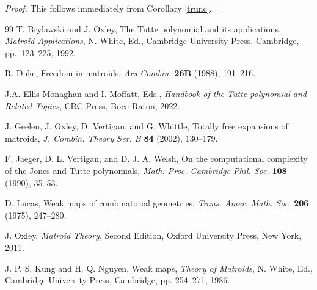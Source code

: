 \documentclass[12pt,reqno]{amsart}
\theoremstyle{definition}
\theoremstyle{remark}
\numberwithin{equation}{section}
\begin{document}
    \begin{proof}
        This follows immediately from Corollary \ref{trunc}. 
    \end{proof}


\begin{thebibliography}{99}
   T. Brylawski and J. Oxley, The Tutte polynomial and its applications, \textit{Matroid Applications}, N. White, Ed., Cambridge University Press, Cambridge, pp.~123–225, 1992.


   R. Duke, Freedom in matroids, \textit{Ars Combin.} \textbf{26B} (1988), 191--216.

   J.A. Ellis-Monaghan and I. Moffatt, Eds., \textit{Handbook of the Tutte polynomial and Related Topics}, CRC Press, Boca Raton, 2022. 

   J. Geelen, J. Oxley, D. Vertigan, and G. Whittle, Totally free expansions of matroids, \textit{J. Combin. Theory Ser. B} \textbf{84} (2002), 130–179.

   F. Jaeger, D. L. Vertigan, and D. J. A. Welsh, On the computational complexity of the Jones and Tutte polynomials, \textit{Math. Proc. Cambridge Phil. Soc.} \textbf{108} (1990), 35–53.

   D. Lucas, Weak maps of combinatorial geometries, \textit{Trans. Amer. Math. Soc.} \textbf{206} (1975), 247--280.

   J. Oxley, \textit{Matroid Theory}, Second Edition, Oxford University Press, New York, 2011.  

   J. P. S. Kung and H. Q. Nguyen, Weak maps, \textit{Theory of Matroids}, N. White, Ed., Cambridge University Press, Cambridge, pp. 254--271, 1986.
\end{thebibliography}
\end{document}

